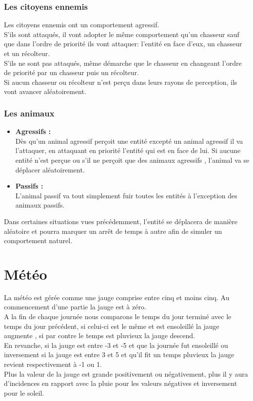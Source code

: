 \documentclass[a4paper]{memoir}
\begin{document}
				\subsubsection{Les citoyens ennemis}
					Les citoyens ennemis ont un comportement agressif.\\
					S'ils sont attaqués, il vont adopter le même comportement qu'un chasseur sauf que dans l'ordre de priorité ils vont attaquer: l'entité en face d'eux, un chasseur et un récolteur.\\
					S'ils ne sont pas attaqués, même démarche que le chasseur en changeant l'ordre de priorité par un chasseur puis un récolteur.\\
					Si aucun chasseur ou récolteur n'est perçu dans leurs rayons de perception, ils vont avancer aléatoirement.
			
				\subsubsection{Les animaux}
					\begin{itemize}[label=$\bullet$]
						\item \textbf{Agressifs :} \\
							Dès qu'un animal agressif perçoit une entité excepté un animal agressif il va l'attaquer, en attaquant en priorité l'entité qui est en face de lui. Si aucune entité n'est perçue ou s'il ne perçoit que des animaux agressifs , l'animal va se déplacer aléatoirement.
						\item \textbf{Passifs :} \\
							L'animal passif va tout simplement fuir toutes les entités à l'exception des animaux passifs.
					\end{itemize} \normalsize 

				Dans certaines situations vues précédemment, l’entité se déplacera de manière aléatoire et pourra marquer un arrêt de temps à autre afin de simuler un comportement naturel.
	
		\section{Météo}
			La météo est gérée comme une jauge comprise entre cinq et moins cinq. Au commencement d'une partie la jauge est à zéro.\\
			A la fin de chaque journée nous comparons le temps du jour terminé avec le temps du jour précédent, si celui-ci est le même    et est ensoleillé la jauge augmente , si par contre le temps est pluvieux la jauge descend.\\
			En revanche, si la jauge est entre -3 et -5 et que la journée fut ensoleillé ou inversement si la jauge est entre 3 et 5 et qu'il fit un temps pluvieux la jauge revient respectivement à -1 ou 1.\\
			Plus la valeur de la jauge est grande positivement ou négativement, plus il y aura d'incidences en rapport avec la pluie pour les valeurs négatives et inversement pour le soleil.
	
\end{document}
